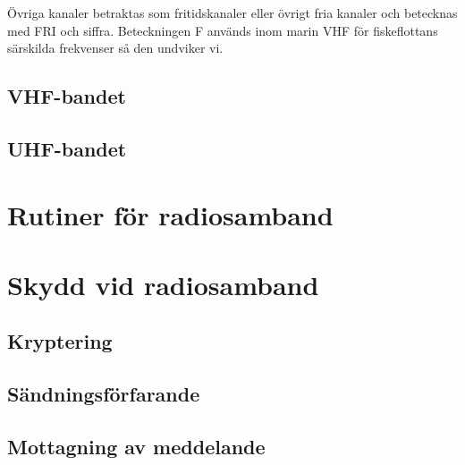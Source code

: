 \documentclass[12ypt,swedish,a4paper]{report}
\begin{document}
Övriga kanaler betraktas som fritidskanaler eller övrigt fria kanaler och betecknas med FRI och siffra. Beteckningen F används inom marin VHF för fiskeflottans särskilda frekvenser så den undviker vi.

\section{VHF-bandet}

\section{UHF-bandet}

\chapter{Rutiner för radiosamband}

\chapter{Skydd vid radiosamband}

\section{Kryptering}

\section{Sändningsförfarande}

\section{Mottagning av meddelande}
\end{document}
